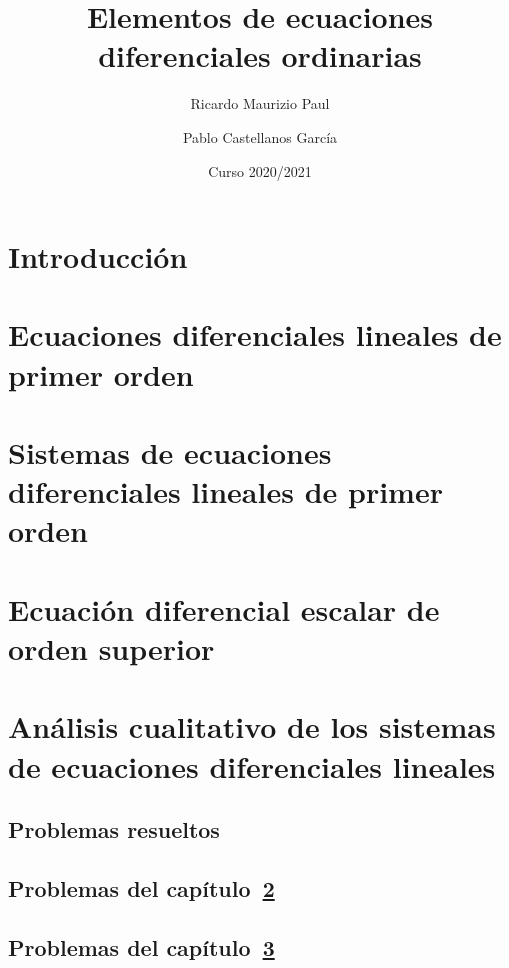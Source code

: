 \documentclass{report}
\title{Elementos de ecuaciones diferenciales ordinarias}
\author{Ricardo Maurizio Paul \and Pablo Castellanos García}
\date{Curso 2020/2021}
\begin{document}
\maketitle
\tableofcontents

\setcounter{chapter}{-1}
\chapter{Introducción}


\chapter{Ecuaciones diferenciales lineales de primer orden}
\label{chap:capitulo1}


\chapter{Sistemas de ecuaciones diferenciales lineales de primer orden}
\label{chap:capitulo2}



\chapter{Ecuación diferencial escalar de orden superior}
\label{chap:capitulo3}


\chapter{Análisis cualitativo de los sistemas de ecuaciones diferenciales lineales}
\label{chap:capitulo3}


\begin{appendices}

\chapter{Problemas resueltos}

\section{Problemas del capítulo~\ref{chap:capitulo1}}


\section{Problemas del capítulo~\ref{chap:capitulo2}}


\end{appendices}
\end{document}
